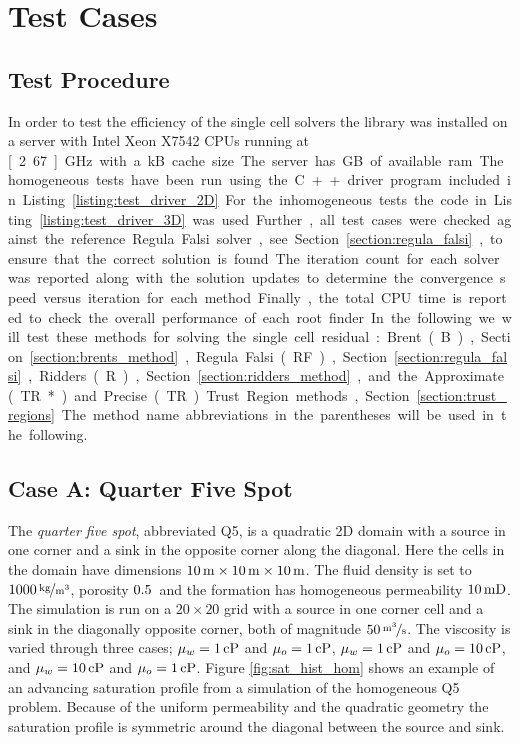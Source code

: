 \section{Test Cases}
\label{section:test_cases}
\subsection{Test Procedure}
\label{section:test_procedure}
In order to test the efficiency of the single cell solvers the \opm library was installed on a server with Intel\textregistered{}  Xeon\textregistered{}  X7542 CPUs running at \unit[2.67]{GHz} with a \unit[18432]{kB} cache size. The server has \unit[252]{GB} of available ram. The homogeneous tests have been run using the C++ driver program included in Listing \ref{listing:test_driver_2D}. For the inhomogeneous tests the code in Listing \ref{listing:test_driver_3D} was used. Further, all test cases were checked against the reference Regula Falsi solver, see Section \ref{section:regula_falsi}, to ensure that the correct solution is found. The iteration count for each solver was reported along with the solution updates to determine the convergence speed versus iteration for each method. Finally, the total CPU time is reported to check the overall performance of each root finder. In the following we will test these methods for solving the single cell residual: Brent (B), Section \ref{section:brents_method}, Regula Falsi (RF), Section \ref{section:regula_falsi}, Ridders (R), Section \ref{section:ridders_method}, and the Approximate (TR*) and Precise (TR) Trust Region methods, Section \ref{section:trust_regions}. The method name abbreviations in the parentheses will be used in the following.

\subsection{Case A: Quarter Five Spot}
\label{section:caseA}
The \emph{quarter five spot}, abbreviated Q5, is a quadratic 2D domain with a source in one corner and a sink in the opposite corner along the diagonal. Here the cells in the domain have dimensions $\unit[10]{m}\times\unit[10]{m}\times\unit[10]{m}$. The fluid density is set to $\unitfrac[1000]{kg}{m^3}$, porosity $\unit[0.5]{}$ and the formation has homogeneous permeability $\unit[10]{mD}$. The simulation is run on a $20\times 20$ grid with a source in one corner cell and a sink in the diagonally opposite corner, both of magnitude $\unitfrac[50]{m^3}{s}$. The viscosity is varied through three cases; $\mu_w = \unit[1]{cP}$ and $\mu_o= \unit[1]{cP}$, $\mu_w = \unit[1]{cP}$ and $\mu_o= \unit[10]{cP}$, and $\mu_w = \unit[10]{cP}$ and $\mu_o= \unit[1]{cP}$. Figure \ref{fig:sat_hist_hom} shows an example of an advancing saturation profile from a simulation of the homogeneous Q5 problem. Because of the uniform permeability and the quadratic geometry the saturation profile is symmetric around the diagonal between the source and sink.


